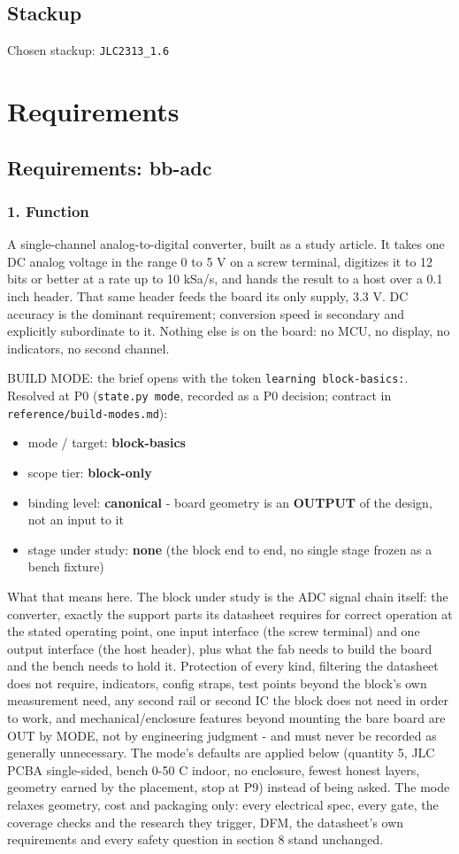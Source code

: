 \documentclass[11pt,a4paper]{article}
\begin{document}
\subsection*{Stackup}
Chosen stackup: \texttt{JLC2313\_1.6}
\section{Requirements}
\subsection*{Requirements: bb-adc}
\subsubsection*{1. Function}
A single-channel analog-to-digital converter, built as a study article. It takes one DC analog voltage in the range 0 to 5 V on a screw terminal, digitizes it to 12 bits or better at a rate up to 10 kSa/s, and hands the result to a host over a 0.1 inch header. That same header feeds the board its only supply, 3.3 V. DC accuracy is the dominant requirement; conversion speed is secondary and explicitly subordinate to it. Nothing else is on the board: no MCU, no display, no indicators, no second channel.

BUILD MODE: the brief opens with the token \texttt{learning block-basics:}. Resolved at P0 (\texttt{state.py mode}, recorded as a P0 decision; contract in \texttt{reference/build-modes.md}):

\begin{itemize}
\item mode / target: \textbf{block-basics}
\item scope tier: \textbf{block-only}
\item binding level: \textbf{canonical} - board geometry is an \textbf{OUTPUT} of the design,
not an input to it
\item stage under study: \textbf{none} (the block end to end, no single stage frozen as
a bench fixture)
\end{itemize}
What that means here. The block under study is the ADC signal chain itself: the converter, exactly the support parts its datasheet requires for correct operation at the stated operating point, one input interface (the screw terminal) and one output interface (the host header), plus what the fab needs to build the board and the bench needs to hold it. Protection of every kind, filtering the datasheet does not require, indicators, config straps, test points beyond the block's own measurement need, any second rail or second IC the block does not need in order to work, and mechanical/enclosure features beyond mounting the bare board are OUT by MODE, not by engineering judgment - and must never be recorded as generally unnecessary. The mode's defaults are applied below (quantity 5, JLC PCBA single-sided, bench 0-50 C indoor, no enclosure, fewest honest layers, geometry earned by the placement, stop at P9) instead of being asked. The mode relaxes geometry, cost and packaging only: every electrical spec, every gate, the coverage checks and the research they trigger, DFM, the datasheet's own requirements and every safety question in section 8 stand unchanged.
\end{document}
